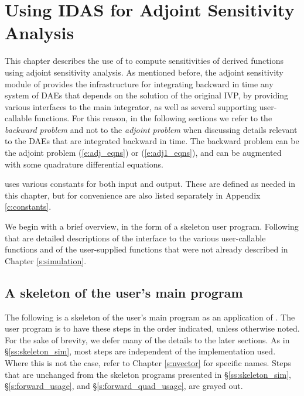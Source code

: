 \chapter{Using IDAS for Adjoint Sensitivity Analysis}\label{s:adjoint}

This chapter describes the use of {\idas} to compute sensitivities of derived 
functions using adjoint sensitivity analysis. As mentioned before, the adjoint
sensitivity module of {\idas} provides the infrastructure for integrating
backward in time any system of DAEs that depends on the solution of the original
IVP, by providing various interfaces to the main {\idas} integrator, as well 
as several supporting user-callable functions. For this reason, in the following
sections we refer to the {\em backward problem} and not to the 
{\em adjoint problem} when discussing details relevant to the DAEs that
are integrated backward in  time. The backward problem can be the adjoint problem
(\ref{e:adj_eqns}) or (\ref{e:adj1_eqns}), and
can be augmented with some quadrature differential equations.

{\idas} uses various constants for both input and output.  These are
defined as needed in this chapter, but for convenience are also listed
separately in Appendix \ref{c:constants}.

We begin with a brief overview, in the form of a skeleton user program.
Following that are detailed descriptions of the interface to the
various user-callable functions and of the user-supplied functions that were
not already described in Chapter \ref{s:simulation}.

\section{A skeleton of the user's main program}\label{ss:skeleton_adj}
The following is a skeleton of the user's main program as an application of
{\idas}. The user program is to have these steps in the order indicated, 
unless otherwise noted. For the sake of brevity, we defer many of the details to 
the later sections.
As in \S\ref{ss:skeleton_sim}, most steps are independent of the {\nvector}
implementation used.
Where this is not the case, refer to Chapter \ref{s:nvector} for specific names.
Steps that are unchanged from the skeleton programs presented in
\S\ref{ss:skeleton_sim}, \S\ref{s:forward_usage}, and \S\ref{s:forward_quad_usage},
are grayed out.

